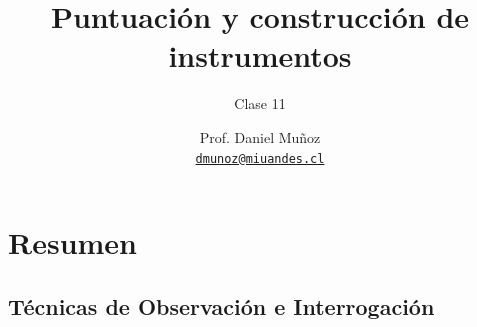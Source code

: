 \documentclass[11pt, aspectratio=169, xcolor=table,hyphens]{beamer}
\begin{document}
\author{Prof. Daniel Muñoz \\
	\href{mailto:dmunoz@miuandes.cl}{\texttt{dmunoz@miuandes.cl}}}
\title{Puntuación y construcción de instrumentos}
\subtitle{Clase 11}
\date{}
\maketitle

\section{Resumen}

\subsection{Técnicas de Observación e Interrogación}
\end{document}
